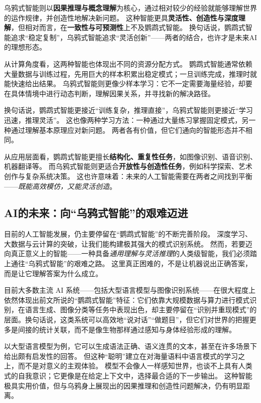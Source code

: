 乌鸦式智能则以\textbf{因果推理与概念理解}为核心，通过相对较少的经验就能够理解世界的运作规律，并创造性地解决新问题。
这种智能更具\textbf{灵活性、创造性与深度理解}，但相对而言，在\textbf{一致性与可预测性}上不及鹦鹉式智能。  
换句话说，鹦鹉式智能追求“稳定复制”，乌鸦式智能追求“灵活创新”——两者的结合，也许才是未来AI的理想形态。  

从计算角度看，这两种智能也体现出不同的资源分配方式。  
鹦鹉式智能通常依赖大量数据与训练过程，先用巨大的样本积累出稳定模式；一旦训练完成，推理时就能快速给出结果。  
乌鸦式智能则更像少样本学习：它不一定需要海量经验，却要在具体情境中进行动态判断，理解因果关系，并寻找新的解决路径。

换句话说，鹦鹉式智能更接近“训练复杂，推理直接”，乌鸦式智能则更接近“学习迅速，推理灵活”。  
这也像两种学习方法：一种通过大量练习掌握固定模式，另一种通过理解基本原理应对新问题。  
两者各有价值，但它们通向的智能形态并不相同。

从应用层面看，鹦鹉式智能更擅长\textbf{结构化、重复性任务}，如图像识别、语音识别、机器翻译等。  
而乌鸦式智能则更适合\textbf{开放性与创造性任务}，例如科学探索、艺术创作与复杂系统决策。  
这也许意味着：未来的人工智能需要在两者之间找到平衡——\emph{既能高效模仿，又能灵活创造}。  

\subsection{AI的未来：向“乌鸦式智能”的艰难迈进}

目前的人工智能发展，仍主要停留在“鹦鹉式智能”的不断完善阶段。  
深度学习、大数据与云计算的突破，让我们能构建极其强大的模式识别系统。  
然而，若要迈向真正意义上的智能——一种具备\emph{通用理解与灵活推理}的人类级智能，我们必须踏上通往“乌鸦式智能”的艰难之路。  
这里真正困难的，不是让机器说出正确答案，而是让它理解答案为什么成立。  

目前大多数主流 AI 系统——包括大型语言模型与图像识别系统——在很大程度上依然体现出前文所说的“鹦鹉式智能”特征：它们依靠大规模数据与算力进行模式识别，在语言生成、图像分类等任务中表现出色，却主要停留在“识别并重现模式”的层面。换句话说，这类系统可以高效地“说对话”“做题目”，但它们对世界的把握更多是间接的统计关联，而不是像生物那样通过感知与身体经验形成的理解。

以大型语言模型为例，它可以生成语法正确、语义连贯的文本，甚至在许多场景下给出颇有启发性的回答。  
但这种“聪明”建立在对海量语料中语言模式的学习之上，而不是对意义的主观体验。  
模型不会像人一样感知世界，也谈不上具有人类式的自我意识；它更像是在给定上下文中，选择最合适的下一步输出。  
这种智能极具实用价值，但与乌鸦身上展现出的因果推理和创造性问题解决，仍有明显距离。

